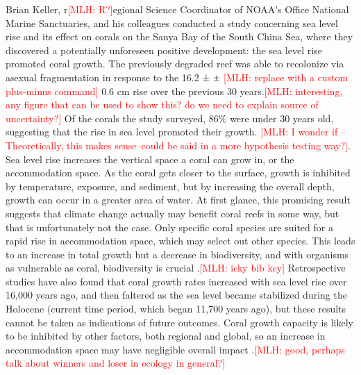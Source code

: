 \documentclass{book}\usepackage{knitr}
\newcommand{\red}[1]{\textcolor{red}{[MLH: #1]}}
\newcommand{\Mypm}{\mathbin{\tikz [x=1.4ex,y=1.4ex,line width=.1ex] \draw (0.0,0) -- (1.0,0) (0.5,0.08) -- (0.5,0.92) (0.0,0.5) -- (1.0,0.5);}}%
\begin{document}
\begin{knitrout}
\begin{kframe}
{Brian Keller, r\red{R?}egional Science Coordinator of NOAA's Office National Marine Sanctuaries, and his colleagues conducted a study concerning sea level rise and its effect on corals on the Sanya Bay of the South China Sea, where they discovered a potentially unforeseen positive development: the sea level rise promoted coral growth. The previously degraded reef was able to recolonize via asexual fragmentation in response to the 16.2 ± $\Mypm$ \red{replace with a custom plus-minus command} 0.6 cm rise over the previous 30 years.\red{interesting, any figure that can be used to show this? do we need to explain source of uncertainty?} Of the corals the study surveyed, 86\% were under 30 years old, suggesting that the rise in sea level promoted their growth. \red{I wonder if --Theoretically, this makes sense--could be said in a more hypothesis testing way?}. Sea level rise increases the vertical space a coral can grow in, or the accommodation space. As the coral gets closer to the surface, growth is inhibited by temperature, exposure, and sediment, but by increasing the overall depth, growth can occur in a greater area of water. At first glance, this promising result suggests that climate change actually may benefit coral reefs in some way, but that is unfortunately not the case. Only specific coral species are suited for a rapid rise in accommodation space, which may select out other species. This leads to an increase in total growth but a decrease in biodiversity, and with organisms as vulnerable as coral, biodiversity is crucial \citep{https://doi.org/10.1029/2018JC014534}.\red{icky bib key} Retrospective studies have also found that coral growth rates increased with sea level rise over 16,000 years ago, and then faltered as the sea level became stabilized during the Holocene (current time period, which began 11,700 years ago), but these results cannot be taken as indications of future outcomes. Coral growth capacity is likely to be inhibited by other factors, both regional and global, so an increase in accommodation space may have negligible overall impact \citep{Keller2009ClimateCC}.\red{good, perhaps talk about winners and loser in ecology in general?}

}
\end{kframe}
\end{knitrout}
\end{document}
